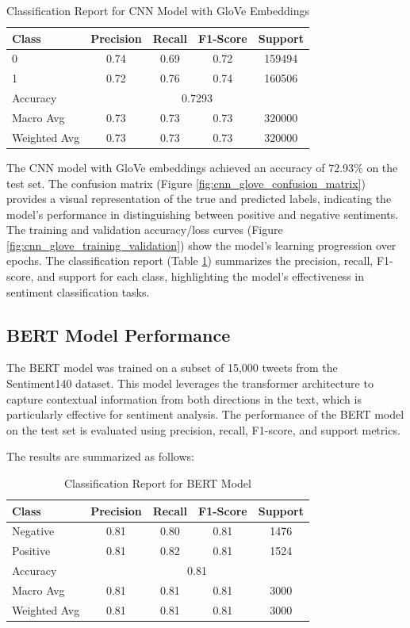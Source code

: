 \documentclass[12pt]{article}
\begin{document}
\begin{table}[H]
    \centering
    \begin{tabular}{lcccc}
    \hline
    Class & Precision & Recall & F1-Score & Support \\
    \hline
    0 & 0.74 & 0.69 & 0.72 & 159494 \\
    1 & 0.72 & 0.76 & 0.74 & 160506 \\
    \hline
    Accuracy & \multicolumn{4}{c}{0.7293} \\
    Macro Avg & 0.73 & 0.73 & 0.73 & 320000 \\
    Weighted Avg & 0.73 & 0.73 & 0.73 & 320000 \\
    \hline
    \end{tabular}
    \caption{Classification Report for CNN Model with GloVe Embeddings}
    \label{tab:cnn_glove_classification_report}
\end{table}

The CNN model with GloVe embeddings achieved an accuracy of 72.93\% on the test set. The confusion matrix (Figure \ref{fig:cnn_glove_confusion_matrix}) provides a visual representation of the true and predicted labels, indicating the model's performance in distinguishing between positive and negative sentiments. The training and validation accuracy/loss curves (Figure \ref{fig:cnn_glove_training_validation}) show the model's learning progression over epochs. The classification report (Table \ref{tab:cnn_glove_classification_report}) summarizes the precision, recall, F1-score, and support for each class, highlighting the model's effectiveness in sentiment classification tasks.


\subsection{BERT Model Performance}
The BERT model was trained on a subset of 15,000 tweets from the Sentiment140 dataset. This model leverages the transformer architecture to capture contextual information from both directions in the text, which is particularly effective for sentiment analysis. The performance of the BERT model on the test set is evaluated using precision, recall, F1-score, and support metrics.

The results are summarized as follows:

\begin{table}[H]
    \centering
    \begin{tabular}{lcccc}
    \hline
    Class & Precision & Recall & F1-Score & Support \\
    \hline
    Negative & 0.81 & 0.80 & 0.81 & 1476 \\
    Positive & 0.81 & 0.82 & 0.81 & 1524 \\
    \hline
    Accuracy & \multicolumn{4}{c}{0.81} \\
    Macro Avg & 0.81 & 0.81 & 0.81 & 3000 \\
    Weighted Avg & 0.81 & 0.81 & 0.81 & 3000 \\
    \hline
    \end{tabular}
    \caption{Classification Report for BERT Model}
    \label{tab:bert_classification_report}
\end{table}
\end{document}
